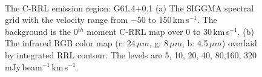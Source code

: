 \documentclass[manuscript]{aastex61}
\newcommand{\kms}{\,km\,s$^{-1}$}
\newcommand{\um}{\mu m}
\begin{document}
\begin{figure}[H]
\centering
{}
\\
\caption{The C-RRL emission region: G61.4+0.1
          (a) The SIGGMA spectral grid with the velocity range from $-50$ to $150$\kms.
	  The background is the 0$^{th}$ moment C-RRL map over $0$ to $30$\kms.
	  (b) The infrared RGB color map (r: 24\,$\um$, g: 8\,$\um$, b: 4.5\,$\um$) overlaid by integrated RRL contour.
	  The levels are 5, 10, 20, 40, 80,160, 320 mJy\,beam$^{-1}$\kms.}
\label{fig_crrl-g614}
\end{figure}
\end{document}
